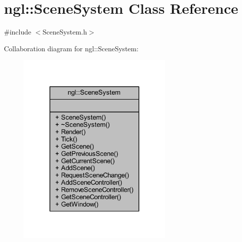\hypertarget{classngl_1_1_scene_system}{}\section{ngl\+:\+:Scene\+System Class Reference}
\label{classngl_1_1_scene_system}


{\ttfamily \#include $<$Scene\+System.\+h$>$}



Collaboration diagram for ngl\+:\+:Scene\+System\+:
\nopagebreak
\begin{figure}[H]
\begin{center}
\leavevmode
\includegraphics[width=215pt]{classngl_1_1_scene_system__coll__graph}
\end{center}
\end{figure}
